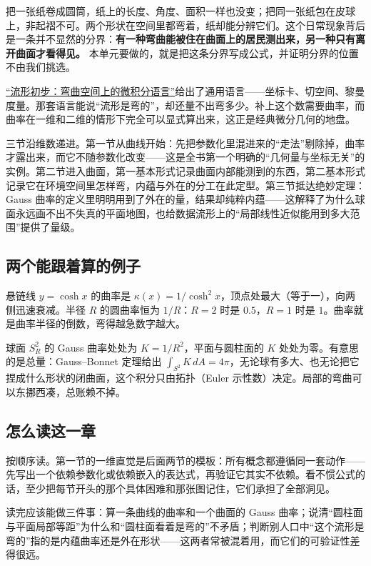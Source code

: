 把一张纸卷成圆筒，纸上的长度、角度、面积一样也没变；把同一张纸包在皮球上，非起褶不可。两个形状在空间里都弯着，纸却能分辨它们。这个日常现象背后是一条并不显然的分界：\textbf{有一种弯曲能被住在曲面上的居民测出来，另一种只有离开曲面才看得见。} 本单元要做的，就是把这条分界写成公式，并证明分界的位置不由我们挑选。

\hyperref[ch:104]{``流形初步：弯曲空间上的微积分语言''}给出了通用语言——坐标卡、切空间、黎曼度量。那套语言能说``流形是弯的''，却还量不出弯多少。补上这个数需要曲率，而曲率在一维和二维的情形下完全可以显式算出来，这正是经典微分几何的地盘。

三节沿维数递进。第一节从曲线开始：先把参数化里混进来的``走法''剔除掉，曲率才露出来，而它不随参数化改变——这是全书第一个明确的``几何量与坐标无关''的实例。第二节进入曲面，第一基本形式记录曲面内部能测到的东西，第二基本形式记录它在环境空间里怎样弯，内蕴与外在的分工在此定型。第三节抵达绝妙定理：Gauss 曲率的定义里明明用到了外在的量，结果却纯粹内蕴——这解释了为什么球面永远画不出不失真的平面地图，也给数据流形上的``局部线性近似能用到多大范围''提供了量级。

\subsection{两个能跟着算的例子}

悬链线 \(y=\cosh x\) 的曲率是 \(\kappa(x)=1/\cosh^{2}x\)，顶点处最大（等于一），向两侧迅速衰减。半径 \(R\) 的圆曲率恒为 \(1/R\)：\(R=2\) 时是 \(0.5\)，\(R=1\) 时是 \(1\)。曲率就是曲率半径的倒数，弯得越急数字越大。

球面 \(S^{2}_{R}\) 的 Gauss 曲率处处为 \(K=1/R^{2}\)，平面与圆柱面的 \(K\) 处处为零。有意思的是总量：Gauss--Bonnet 定理给出 \(\int_{S^{2}}K\,dA=4\pi\)，无论球有多大、也无论把它捏成什么形状的闭曲面，这个积分只由拓扑（Euler 示性数）决定。局部的弯曲可以东挪西凑，总账赖不掉。

\subsection{怎么读这一章}

按顺序读。第一节的一维直觉是后面两节的模板：所有概念都遵循同一套动作——先写出一个依赖参数化或依赖嵌入的表达式，再验证它其实不依赖。看不惯公式的话，至少把每节开头的那个具体困难和那张图记住，它们承担了全部洞见。

读完应该能做三件事：算一条曲线的曲率和一个曲面的 Gauss 曲率；说清``圆柱面与平面局部等距''为什么和``圆柱面看着是弯的''不矛盾；判断别人口中``这个流形是弯的''指的是内蕴曲率还是外在形状——这两者常被混着用，而它们的可验证性差得很远。


